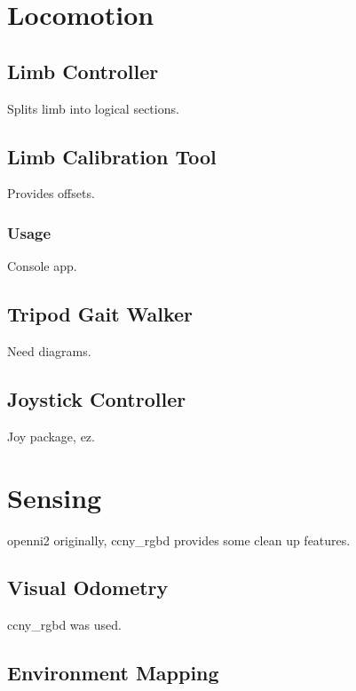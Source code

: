 
\section{Locomotion}

\subsection{Limb Controller}

Splits limb into logical sections.

\subsection{Limb Calibration Tool}

Provides offsets.

\subsubsection{Usage}

Console app.

\subsection{Tripod Gait Walker}

Need diagrams.

\subsection{Joystick Controller}
Joy package, ez.


\section{Sensing}

openni2 originally, ccny\_rgbd \cite{ccny_rgbd} provides some clean up features.

\subsection{Visual Odometry}

ccny\_rgbd \cite{ccny_rgbd} was used.

\subsection{Environment Mapping}

